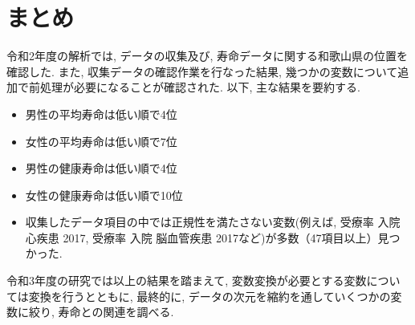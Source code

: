 \chapter{まとめ}

令和2年度の解析では, データの収集及び, 寿命データに関する和歌山県の位置を確認した.
また, 収集データの確認作業を行なった結果, 幾つかの変数について追加で前処理が必要になることが確認された.
以下, 主な結果を要約する.
\begin{itemize}
	\item 男性の平均寿命は低い順で4位
	\item 女性の平均寿命は低い順で7位
	\item 男性の健康寿命は低い順で4位
	\item 女性の健康寿命は低い順で10位
	\item 収集したデータ項目の中では正規性を満たさない変数(例えば, 受療率 入院 心疾患 2017, 受療率 入院 脳血管疾患 2017など)が多数（47項目以上）見つかった.
\end{itemize}


令和3年度の研究では以上の結果を踏まえて,
変数変換が必要とする変数については変換を行うとともに,
最終的に, データの次元を縮約を通していくつかの変数に絞り,
寿命との関連を調べる.






%
%
%
%
%
%
%
%
%




